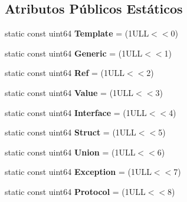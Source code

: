 \subsection*{Atributos Públicos Estáticos}
\begin{DoxyCompactItemize}
\item 
\hypertarget{class_entry_a2b0e47b5cd4ac15479171542157550af}{static const uint64 {\bfseries Template} = (1\-U\-L\-L$<$$<$0)}\label{class_entry_a2b0e47b5cd4ac15479171542157550af}

\item 
\hypertarget{class_entry_ad359a15af7b39222378e853f0fe4013b}{static const uint64 {\bfseries Generic} = (1\-U\-L\-L$<$$<$1)}\label{class_entry_ad359a15af7b39222378e853f0fe4013b}

\item 
\hypertarget{class_entry_a976e7874bcc453799a28ff08632dfa3f}{static const uint64 {\bfseries Ref} = (1\-U\-L\-L$<$$<$2)}\label{class_entry_a976e7874bcc453799a28ff08632dfa3f}

\item 
\hypertarget{class_entry_a7bac6187b40d57420acf709dbde30f4b}{static const uint64 {\bfseries Value} = (1\-U\-L\-L$<$$<$3)}\label{class_entry_a7bac6187b40d57420acf709dbde30f4b}

\item 
\hypertarget{class_entry_a2d78a9f33d664808c94018b3c263059b}{static const uint64 {\bfseries Interface} = (1\-U\-L\-L$<$$<$4)}\label{class_entry_a2d78a9f33d664808c94018b3c263059b}

\item 
\hypertarget{class_entry_ae23e2515fe8a737f60e9d563daeabb34}{static const uint64 {\bfseries Struct} = (1\-U\-L\-L$<$$<$5)}\label{class_entry_ae23e2515fe8a737f60e9d563daeabb34}

\item 
\hypertarget{class_entry_a87d0202cdb45a47ff533b24588975e7f}{static const uint64 {\bfseries Union} = (1\-U\-L\-L$<$$<$6)}\label{class_entry_a87d0202cdb45a47ff533b24588975e7f}

\item 
\hypertarget{class_entry_a88b35594247ef004425a1705ddaf9e6a}{static const uint64 {\bfseries Exception} = (1\-U\-L\-L$<$$<$7)}\label{class_entry_a88b35594247ef004425a1705ddaf9e6a}

\item 
\hypertarget{class_entry_a228b4fdcf3fe490bc5dfc7ac471d84d8}{static const uint64 {\bfseries Protocol} = (1\-U\-L\-L$<$$<$8)}\label{class_entry_a228b4fdcf3fe490bc5dfc7ac471d84d8}


\end{DoxyCompactItemize}
